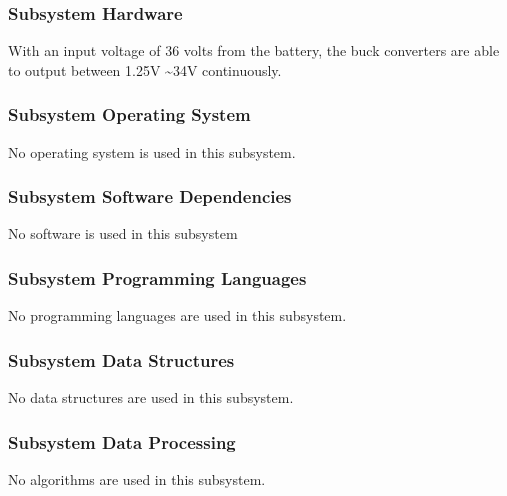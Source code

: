 \subsubsection{Subsystem Hardware}
With an input voltage of 36 volts from the battery, the buck converters are able to output between 1.25V \textasciitilde 34V continuously.

\subsubsection{Subsystem Operating System}
No operating system is used in this subsystem.

\subsubsection{Subsystem Software Dependencies}
No software is used in this subsystem

\subsubsection{Subsystem Programming Languages}
No programming languages are used in this subsystem.

\subsubsection{Subsystem Data Structures}
No data structures are used in this subsystem.

\subsubsection{Subsystem Data Processing}
No algorithms are used in this subsystem.
